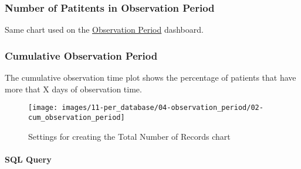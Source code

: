 \documentclass[
]{book}
\begin{document}
\hypertarget{number-of-patitents-in-observation-period}{%
\subsubsection*{Number of Patitents in Observation Period}\label{number-of-patitents-in-observation-period}}

Same chart used on the \protect\hyperlink{numInObservationPeriod}{Observation Period} dashboard.

\hypertarget{cumulative-observation-period}{%
\subsubsection*{Cumulative Observation Period}\label{cumulative-observation-period}}

The cumulative observation time plot shows the percentage of patients that have more that X days of observation time.

\begin{figure}
\texttt{[image: images/11-per\_database/04-observation\_period/02-cum\_observation\_period]} \caption{Settings for creating the Total Number of Records chart}\label{fig:cumObservationTime}
\end{figure}

\hypertarget{sql-query-4}{%
\paragraph*{SQL Query}\label{sql-query-4}}
\end{document}
